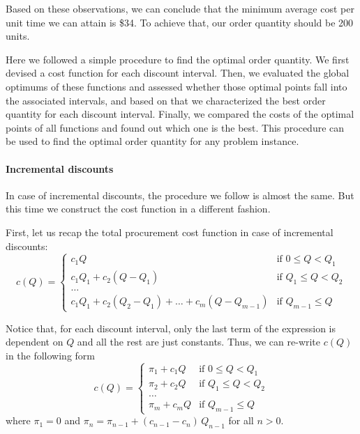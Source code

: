 \begin{solution}
Based on these observations, we can conclude that the minimum average cost per unit time we can attain is \$34. To achieve that, our order quantity should be 200 units.

Here we followed a simple procedure to find the optimal order quantity. We first devised a cost function for each discount interval. Then, we evaluated the global optimums of these functions and assessed whether those optimal points fall into the associated intervals, and based on that we characterized the best order quantity for each discount interval. Finally, we compared the costs of the optimal points of all functions and found out which one is the best. This procedure can be used to find the optimal order quantity for any problem instance. 

\paragraph{Incremental discounts}

In case of incremental discounts, the procedure we follow is almost the same. But this time we construct the cost function in a different fashion.

First, let us recap the total procurement cost function in case of incremental discounts:
\begin{equation*}
c(Q) = 
\begin{cases}
c_1 Q & \text{if } 0 \leq Q < Q_1 \\
c_1 Q_1 + c_2(Q - Q_1) & \text{if } Q_1 \leq Q < Q_2 \\
\ldots \\
c_1 Q_1 + c_2(Q_2 - Q_1) + \ldots + c_m(Q - Q_{m-1}) & \text{if } Q_{m-1} \leq Q 
\end{cases}
\end{equation*}

Notice that, for each discount interval, only the last term of the expression is dependent on $Q$ and all the rest are just constants. Thus, we can re-write $c(Q)$ in the following form
\begin{equation*}
c(Q) = 
\begin{cases}
\pi_1 + c_1 Q & \text{if } 0 \leq Q < Q_1 \\
\pi_2 + c_2 Q & \text{if } Q_1 \leq Q < Q_2 \\
\ldots \\
\pi_m + c_m Q & \text{if } Q_{m-1} \leq Q 
\end{cases}
\end{equation*}
where $\pi_1=0$ and $\pi_n=\pi_{n-1}+(c_{n-1}-c_n)\,Q_{n-1}$ for all $n>0$.


\end{solution}
